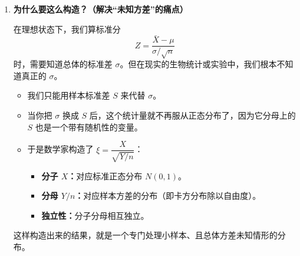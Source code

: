 \begin{enumerate}
    \item \textbf{为什么要这么构造？（解决“未知方差”的痛点）}

    在理想状态下，我们算标准分
    \[
    Z=\frac{\bar{X}-\mu}{\sigma/\sqrt{n}}
    \]
    时，需要知道总体的标准差 $\sigma$。但在现实的生物统计或实验中，我们根本不知道真正的 $\sigma$。

    \begin{itemize}
        \item 我们只能用样本标准差 $S$ 来代替 $\sigma$。
        \item 当你把 $\sigma$ 换成 $S$ 后，这个统计量就不再服从正态分布了，因为它分母上的 $S$ 也是一个带有随机性的变量。
        \item 于是数学家构造了 $\xi=\dfrac{X}{\sqrt{Y/n}}$：
        \begin{itemize}
            \item \textbf{分子 $X$：}对应标准正态分布 $N(0,1)$。
            \item \textbf{分母 $Y/n$：}对应样本方差的分布（即卡方分布除以自由度）。
            \item \textbf{独立性：}分子分母相互独立。
        \end{itemize}
    \end{itemize}

    这样构造出来的结果，就是一个专门处理小样本、且总体方差未知情形的分布。
\end{enumerate}

